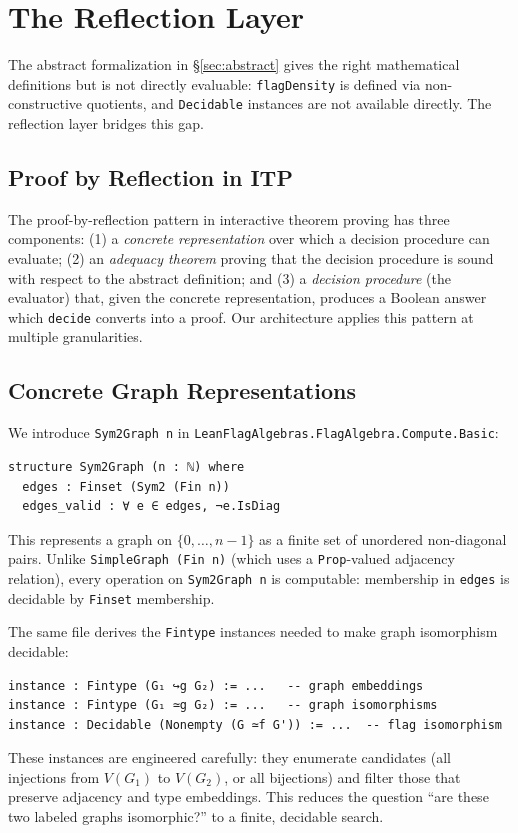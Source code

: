 \documentclass{article}
\newcommand{\lean}[1]{\texttt{#1}}
\begin{document}
\section{The Reflection Layer}
\label{sec:reflection}

The abstract formalization in \S\ref{sec:abstract} gives the right mathematical
definitions but is not directly evaluable: \lean{flagDensity} is defined via
non-constructive quotients, and \lean{Decidable} instances are not available
directly.  The reflection layer bridges this gap.

\subsection{Proof by Reflection in ITP}

The proof-by-reflection pattern in interactive theorem proving has three
components: (1) a \emph{concrete representation} over which a decision
procedure can evaluate; (2) an \emph{adequacy theorem} proving that the
decision procedure is sound with respect to the abstract definition; and (3)
a \emph{decision procedure} (the evaluator) that, given the concrete representation,
produces a Boolean answer which \lean{decide} converts into a proof.  Our
architecture applies this pattern at multiple granularities.

\subsection{Concrete Graph Representations}

We introduce \lean{Sym2Graph n} in
\lean{LeanFlagAlgebras.FlagAlgebra.Compute.Basic}:
\begin{lstlisting}
structure Sym2Graph (n : ℕ) where
  edges : Finset (Sym2 (Fin n))
  edges_valid : ∀ e ∈ edges, ¬e.IsDiag
\end{lstlisting}
This represents a graph on $\{0,\ldots,n-1\}$ as a finite set of unordered
non-diagonal pairs.  Unlike \lean{SimpleGraph (Fin n)} (which uses a
\lean{Prop}-valued adjacency relation), every operation on \lean{Sym2Graph n}
is computable: membership in \lean{edges} is decidable by \lean{Finset}
membership.

The same file derives the \lean{Fintype} instances needed to make graph
isomorphism decidable:
\begin{lstlisting}
instance : Fintype (G₁ ↪g G₂) := ...   -- graph embeddings
instance : Fintype (G₁ ≃g G₂) := ...   -- graph isomorphisms
instance : Decidable (Nonempty (G ≃f G')) := ...  -- flag isomorphism
\end{lstlisting}
These instances are engineered carefully: they enumerate candidates (all
injections from $V(G_1)$ to $V(G_2)$, or all bijections) and filter those
that preserve adjacency and type embeddings.  This reduces the question ``are
these two labeled graphs isomorphic?'' to a finite, decidable search.
\end{document}
